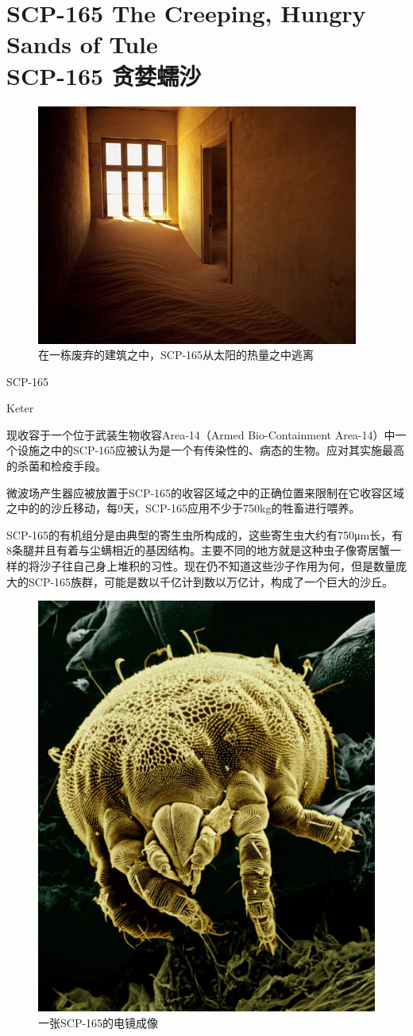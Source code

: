 \chapter[SCP-165 贪婪蠕沙]{
    SCP-165 The Creeping, Hungry Sands of Tule\\
    SCP-165 贪婪蠕沙
}

\label{chap:SCP-165}

\begin{figure}[H]
    \centering
    \includegraphics[width=0.5\linewidth]{images/SCP-165.jpg}
    \caption*{在一栋废弃的建筑之中，SCP-165从太阳的热量之中逃离}
\end{figure}

SCP-165

Keter

现收容于一个位于武装生物收容Area-14（Armed Bio-Containment Area-14）中一个设施之中的SCP-165应被认为是一个有传染性的、病态的生物。应对其实施最高的杀菌和检疫手段。

微波场产生器应被放置于SCP-165的收容区域之中的正确位置来限制在它收容区域之中的的沙丘移动，每9天，SCP-165应用不少于750kg的牲畜进行喂养。

\hr

SCP-165的有机组分是由典型的寄生虫所构成的，这些寄生虫大约有750μm长，有8条腿并且有着与尘螨相近的基因结构。主要不同的地方就是这种虫子像寄居蟹一样的将沙子往自己身上堆积的习性。现在仍不知道这些沙子作用为何，但是数量庞大的SCP-165族群，可能是数以千亿计到数以万亿计，构成了一个巨大的沙丘。

\begin{figure}[H]
    \centering
    \includegraphics[width=0.5\linewidth]{images/SCP-165-2.jpg}
    \caption*{一张SCP-165的电镜成像}
\end{figure}

